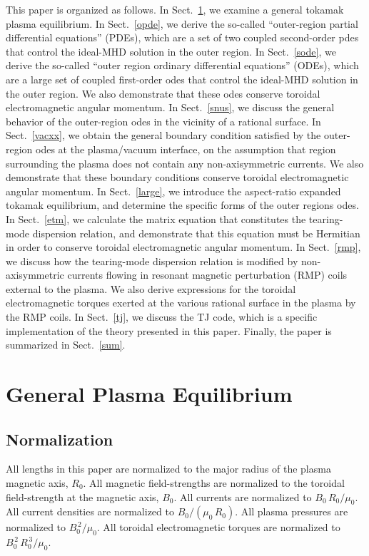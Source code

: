 \documentclass[12pt,prb,aps]{revtex4-1}
\begin{document}
This paper is organized as follows. In Sect.~\ref{geq}, we examine a general tokamak plasma equilibrium. In Sect.~\ref{opde}, we
derive the so-called ``outer-region partial differential equations''  (PDEs), which are a set of two coupled second-order pdes that control   the ideal-MHD solution in the outer region. In
Sect.~\ref{sode}, we derive the so-called ``outer region ordinary differential equations'' (ODEs), which are a large set of coupled first-order 
odes that control the ideal-MHD solution in the outer region. We also demonstrate that these odes conserve toroidal electromagnetic
angular momentum. In Sect.~\ref{snus}, we discuss the general behavior of the outer-region odes in the vicinity of a rational surface. 
In Sect.~\ref{vacxx}, we obtain the general boundary condition satisfied by the outer-region odes at the plasma/vacuum interface, on the assumption that
region surrounding the plasma does not contain any non-axisymmetric currents. We also demonstrate that these boundary conditions conserve
toroidal electromagnetic angular momentum. In Sect.~\ref{large}, we introduce the aspect-ratio expanded tokamak equilibrium, and determine the
specific forms of the outer regions odes. In Sect.~\ref{etm}, we calculate the matrix equation that constitutes the tearing-mode dispersion relation, and
demonstrate that this equation must be Hermitian in order to conserve toroidal electromagnetic angular momentum. In Sect.~\ref{rmp}, 
we discuss how the tearing-mode dispersion relation is modified by non-axisymmetric currents flowing in
resonant magnetic perturbation (RMP) coils external to the plasma. We also derive expressions for the toroidal electromagnetic
torques exerted at the various rational surface in the plasma by the RMP coils. In Sect.~\ref{tj}, we discuss the
TJ code, which is a specific implementation of the theory presented in this paper. Finally, the paper is summarized in Sect.~\ref{sum}.

\section{General Plasma Equilibrium}\label{geq}
\subsection{Normalization}\label{coords}
All lengths in this paper are normalized to  the major radius of the plasma magnetic axis, $R_0$. All magnetic field-strengths
are normalized to the  toroidal field-strength at the magnetic axis, $B_0$. All currents are normalized to $B_0\,R_0/\mu_0$. All current densities are normalized to $B_0/(\mu_0\,R_0)$.  All plasma pressures are normalized to $B_0^{\,2}/\mu_0$.
All toroidal electromagnetic torques are normalized to $B_0^{\,2}\,R_0^{\,3}/\mu_0$. 
\end{document}
